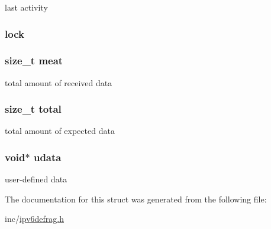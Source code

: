 last activity 

\hypertarget{structntoh__ipv6__flow__t_aad15823e4f2835531e6a02321cd53f7e}{
\subsubsection[{lock}]{ lock}}\label{structntoh__ipv6__flow__t_aad15823e4f2835531e6a02321cd53f7e}
\hypertarget{structntoh__ipv6__flow__t_a25cdc91a1ce3b46649beaacf6315dee7}{
\subsubsection[{meat}]{\setlength{\rightskip}{0pt plus 5cm}size\-\_\-t meat}}\label{structntoh__ipv6__flow__t_a25cdc91a1ce3b46649beaacf6315dee7}


total amount of received data 

\hypertarget{structntoh__ipv6__flow__t_a3fab45bb4d7cd7e889bdf00080096e8e}{
\subsubsection[{total}]{\setlength{\rightskip}{0pt plus 5cm}size\-\_\-t total}}\label{structntoh__ipv6__flow__t_a3fab45bb4d7cd7e889bdf00080096e8e}


total amount of expected data 

\hypertarget{structntoh__ipv6__flow__t_a697ce711b67313990d351b5c95f87aed}{
\subsubsection[{udata}]{\setlength{\rightskip}{0pt plus 5cm}void$\ast$ udata}}\label{structntoh__ipv6__flow__t_a697ce711b67313990d351b5c95f87aed}


user-\/defined data 



The documentation for this struct was generated from the following file\-:\begin{DoxyCompactItemize}
\item 
inc/\hyperlink{ipv6defrag_8h}{ipv6defrag.\-h}\end{DoxyCompactItemize}
